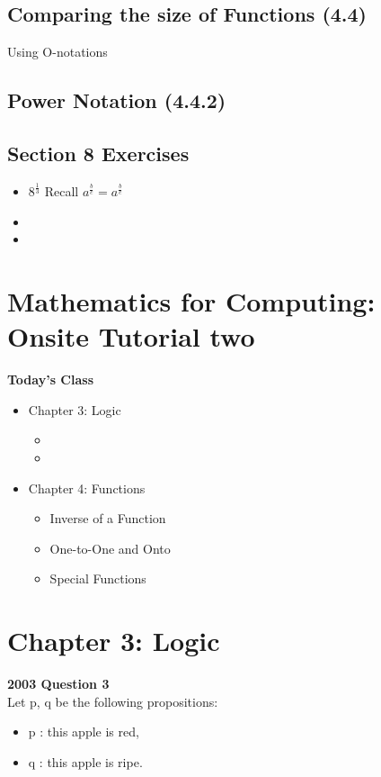 \documentclass{article}
\begin{document}
\subsection*{Comparing the size of Functions (4.4)}

Using O-notations

\subsection*{Power Notation (4.4.2)}


\subsection*{Section 8 Exercises}
\begin{itemize}
\item $8^{\frac{1}{3}}$ Recall $a^{\frac{b}{c}} = a^{\frac{b}{c}}$
\item
\item
\end{itemize}


\section{Mathematics for Computing: Onsite Tutorial two}

\textbf{Today's Class}
\begin{itemize}
\item Chapter 3: Logic
\begin{itemize}
\item
\item
\end{itemize}
\item Chapter 4: Functions
\begin{itemize}
\item Inverse of a Function
\item One-to-One and Onto
\item Special Functions
\end{itemize}
\end{itemize}
\newpage
\section{Chapter 3: Logic}

\textbf{2003 Question 3}\\
Let p, q be the following propositions:
\begin{itemize}
\item p : this apple is red, 
\item q : this apple is ripe.
\end{itemize}
\end{document}
